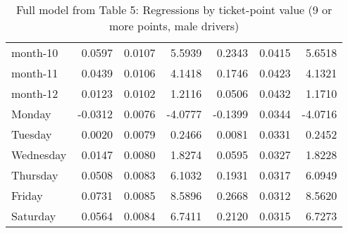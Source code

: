 \documentclass[10pt]{article}
\begin{document}
\begin{table}[ht]
\begin{tabular}{lrrrrrr}
  month-10 & 0.0597 & 0.0107 & 5.5939 & 0.2343 & 0.0415 & 5.6518 \\ 
  month-11 & 0.0439 & 0.0106 & 4.1418 & 0.1746 & 0.0423 & 4.1321 \\ 
  month-12 & 0.0123 & 0.0102 & 1.2116 & 0.0506 & 0.0432 & 1.1710 \\ 
  Monday & -0.0312 & 0.0076 & -4.0777 & -0.1399 & 0.0344 & -4.0716 \\ 
  Tuesday & 0.0020 & 0.0079 & 0.2466 & 0.0081 & 0.0331 & 0.2452 \\ 
  Wednesday & 0.0147 & 0.0080 & 1.8274 & 0.0595 & 0.0327 & 1.8228 \\ 
  Thursday & 0.0508 & 0.0083 & 6.1032 & 0.1931 & 0.0317 & 6.0949 \\ 
  Friday & 0.0731 & 0.0085 & 8.5896 & 0.2668 & 0.0312 & 8.5620 \\ 
  Saturday & 0.0564 & 0.0084 & 6.7411 & 0.2120 & 0.0315 & 6.7273 \\ 
   \hline
\end{tabular}
\caption{Full model from Table 5: Regressions by ticket-point value (9 or more points, male drivers)} 
\label{tab_5_9plus_pts_no_age_M}
\end{table}


\clearpage
\pagebreak



\end{document}
